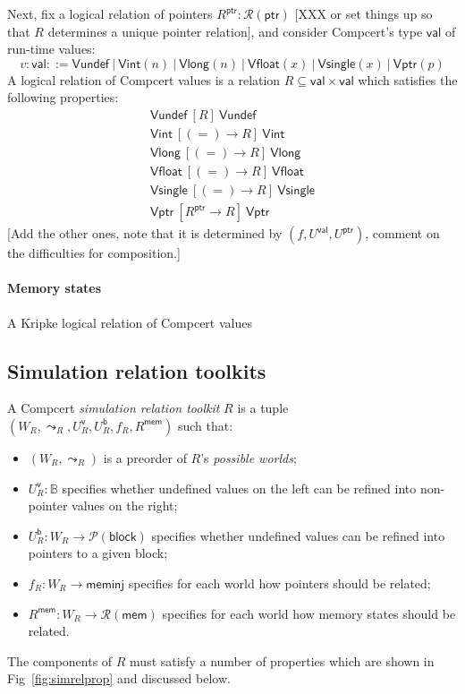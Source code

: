 \documentclass[acmsmall,anonymous]{acmart}
\newcommand{\kw}[1]{\ensuremath{ \textsf{#1} }}
\newcommand{\ifr}[1]{\ [{#1}]\ }
\newcommand{\alt}{\ |\ }
\begin{document}
Next,
fix a logical relation of pointers $R^\kw{ptr} : \mathcal{R}(\kw{ptr})$
[XXX or set things up so that $R$ determines a unique pointer relation],
and consider Compcert's type \kw{val} of run-time values:
\[
  v : \kw{val} ::= \kw{Vundef}
          \alt \kw{Vint}(n)
          \alt \kw{Vlong}(n)
          \alt \kw{Vfloat}(x)
          \alt \kw{Vsingle}(x)
          \alt \kw{Vptr}(p)
\]
A logical relation of Compcert values
is a relation $R \subseteq \kw{val} \times \kw{val}$
which satisfies the following properties:
\begin{gather*}
  \kw{Vundef} \ifr{R} \kw{Vundef} \\
  \kw{Vint} \ifr{(=) \rightarrow R} \kw{Vint} \\
  \kw{Vlong} \ifr{(=) \rightarrow R} \kw{Vlong} \\
  \kw{Vfloat} \ifr{(=) \rightarrow R} \kw{Vfloat} \\
  \kw{Vsingle} \ifr{(=) \rightarrow R} \kw{Vsingle} \\
  \kw{Vptr} \ifr{R^\kw{ptr} \rightarrow R} \kw{Vptr}
\end{gather*}
[Add the other ones, note that it is determined by $(f, U^\kw{val}, U^\kw{ptr})$,
comment on the difficulties for composition.]

\paragraph{Memory states}



A Kripke logical relation of Compcert values 

\subsection{Simulation relation toolkits} %

\begin{definition}[\kw{simrel}]
A Compcert \emph{simulation relation toolkit} $R$
is a tuple $(W_R, \leadsto_R, U^\kw{v}_R, U^\kw{b}_R, f_R, R^\kw{mem})$
such that:
\begin{itemize}
\item $(W_R, \leadsto_R)$
  is a preorder of $R$'s \emph{possible worlds};
\item $U^\kw{v}_R : \mathbb{B}$
  specifies whether undefined values on the left
  can be refined into non-pointer values on the right;
\item $U^\kw{b}_R : W_R \rightarrow \mathcal{P}(\kw{block})$
  specifies whether undefined values can be refined into pointers to a given block;
\item $f_R : W_R \rightarrow \kw{meminj}$
  specifies for each world how pointers should be related;
\item $R^\kw{mem} : W_R \rightarrow \mathcal{R}(\kw{mem})$
  specifies for each world how memory states should be related.
\end{itemize}
The components of $R$ must satisfy
a number of properties which are shown in Fig~\ref{fig:simrelprop}
and discussed below.
\end{definition}
\end{document}
